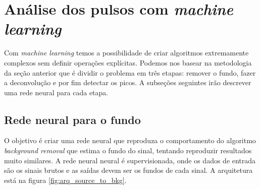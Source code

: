 \documentclass[a4paper,12pt,oneside]{book}
\begin{document}
\section{Análise dos pulsos com \textit{machine learning}}



\par Com \textit{machine learning} temos a possibilidade de criar algoritmos extremamente complexos sem definir operações explícitas. Podemos nos basear na metodologia da seção anterior que é dividir o problema em três etapas: remover o fundo, fazer a deconvolução e por fim detectar os picos. A subseções seguintes irão descrever uma rede neural para cada etapa.

\subsection{Rede neural para o fundo}

\par O objetivo é criar uma rede neural que reproduza o comportamento do algoritmo \textit{background removal} que estima o fundo do sinal, tentando reproduzir resultados muito similares. A rede neural neural é supervisionada, onde os dados de entrada são os sinais brutos e as saídas devem ser os fundos de cada sinal. A arquitetura está na figura \ref{fig:arq_source_to_bkg}.
\end{document}
